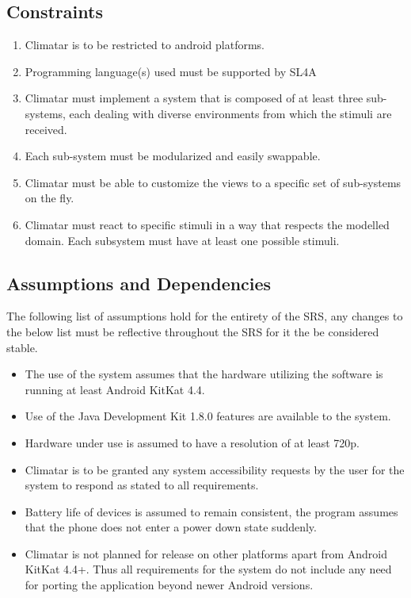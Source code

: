 \documentclass[]{article}
\begin{document}
\subsection{Constraints}
\label{sub:constraints}
\begin{enumerate}
	\item Climatar is to be restricted to android platforms.
	\item Programming language(s) used must be supported by SL4A
	\item  Climatar must implement a system that is composed of at least three sub-systems, each dealing with diverse environments from which the stimuli are received.
	\item Each sub-system must be modularized and easily swappable.
	\item Climatar must be able to customize the views to a specific set of sub-systems on the fly.
	\item  Climatar must react to specific stimuli in a way that respects the modelled domain.  Each subsystem must have at least one possible stimuli.
\end{enumerate}

\subsection{Assumptions and Dependencies}
\label{sub:assumptions_and_dependencies}
The following list of assumptions hold for the entirety of the SRS, any changes to the below list must be reflective throughout the SRS for it the be considered stable.
\begin{itemize}
	\item The use of the system assumes that the hardware utilizing the software is running at least Android KitKat 4.4.
	\item Use of the Java Development Kit 1.8.0 features are available to the system.
	\item Hardware under use is assumed to have a resolution of at least 720p.
	\item Climatar is to be granted any system accessibility requests by the user for the system to respond as stated to all requirements.
	\item Battery life of devices is assumed to remain consistent, the program assumes that the phone does not enter a power down state suddenly.
	\item Climatar is not planned for release on other platforms apart from Android KitKat 4.4+. Thus all requirements for the system do not include any need for porting the application beyond newer Android versions.
\end{itemize}
\end{document}
